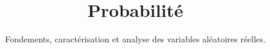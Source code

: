 \documentclass{novel}
\title     {Probabilité}
\subtitle  {Fondements, caractérisation et analyse des variables aléatoires réelles.}
\numberwithin{equation}{chapter}
\theoremstyle{definition}
\theoremstyle{plain}
\theoremstyle{remark}
\theoremstyle{proof}
\begin{document}
\toc



\appendix


  
\end{document}
